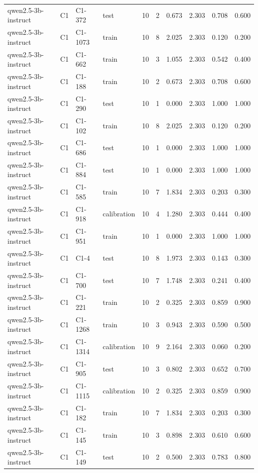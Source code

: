 \begin{table}
\begin{tabular}{llllrrrrrr}
qwen2.5-3b-instruct & C1 & C1-372 & test & 10 & 2 & 0.673 & 2.303 & 0.708 & 0.600 \\
qwen2.5-3b-instruct & C1 & C1-1073 & train & 10 & 8 & 2.025 & 2.303 & 0.120 & 0.200 \\
qwen2.5-3b-instruct & C1 & C1-662 & train & 10 & 3 & 1.055 & 2.303 & 0.542 & 0.400 \\
qwen2.5-3b-instruct & C1 & C1-188 & train & 10 & 2 & 0.673 & 2.303 & 0.708 & 0.600 \\
qwen2.5-3b-instruct & C1 & C1-290 & test & 10 & 1 & 0.000 & 2.303 & 1.000 & 1.000 \\
qwen2.5-3b-instruct & C1 & C1-102 & train & 10 & 8 & 2.025 & 2.303 & 0.120 & 0.200 \\
qwen2.5-3b-instruct & C1 & C1-686 & test & 10 & 1 & 0.000 & 2.303 & 1.000 & 1.000 \\
qwen2.5-3b-instruct & C1 & C1-884 & test & 10 & 1 & 0.000 & 2.303 & 1.000 & 1.000 \\
qwen2.5-3b-instruct & C1 & C1-585 & train & 10 & 7 & 1.834 & 2.303 & 0.203 & 0.300 \\
qwen2.5-3b-instruct & C1 & C1-918 & calibration & 10 & 4 & 1.280 & 2.303 & 0.444 & 0.400 \\
qwen2.5-3b-instruct & C1 & C1-951 & train & 10 & 1 & 0.000 & 2.303 & 1.000 & 1.000 \\
qwen2.5-3b-instruct & C1 & C1-4 & test & 10 & 8 & 1.973 & 2.303 & 0.143 & 0.300 \\
qwen2.5-3b-instruct & C1 & C1-700 & test & 10 & 7 & 1.748 & 2.303 & 0.241 & 0.400 \\
qwen2.5-3b-instruct & C1 & C1-221 & train & 10 & 2 & 0.325 & 2.303 & 0.859 & 0.900 \\
qwen2.5-3b-instruct & C1 & C1-1268 & train & 10 & 3 & 0.943 & 2.303 & 0.590 & 0.500 \\
qwen2.5-3b-instruct & C1 & C1-1314 & calibration & 10 & 9 & 2.164 & 2.303 & 0.060 & 0.200 \\
qwen2.5-3b-instruct & C1 & C1-905 & test & 10 & 3 & 0.802 & 2.303 & 0.652 & 0.700 \\
qwen2.5-3b-instruct & C1 & C1-1115 & calibration & 10 & 2 & 0.325 & 2.303 & 0.859 & 0.900 \\
qwen2.5-3b-instruct & C1 & C1-182 & train & 10 & 7 & 1.834 & 2.303 & 0.203 & 0.300 \\
qwen2.5-3b-instruct & C1 & C1-145 & train & 10 & 3 & 0.898 & 2.303 & 0.610 & 0.600 \\
qwen2.5-3b-instruct & C1 & C1-149 & test & 10 & 2 & 0.500 & 2.303 & 0.783 & 0.800 \\

\end{tabular}
\end{table}
